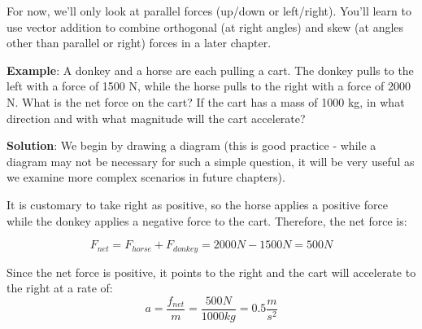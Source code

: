 
For now, we'll only look at parallel forces (up/down or left/right). You'll learn to use vector addition to combine orthogonal (at right angles) and skew (at angles other than parallel or right) forces in a later chapter. 

\textbf{Example}: A donkey and a horse are each pulling a cart. The donkey pulls to the left with a force of 1500 N, while the horse pulls to the right with a force of 2000 N. What is the net force on the cart? If the cart has a mass of 1000 kg, in what direction and with what magnitude will the cart accelerate?

\textbf{Solution}: We begin by drawing a diagram (this is good practice - while a diagram may not be necessary for such a simple question, it will be very useful as we examine more complex scenarios in future chapters). 


It is customary to take right as positive, so the horse applies a positive force while the donkey applies a negative force to the cart. Therefore, the net force is:

$$F_{net} = F_{horse} + F_{donkey} = 2000N - 1500N = 500N$$

Since the net force is positive, it points to the right and the cart will accelerate to the right at a rate of:
$$a = \frac{f_{net}}{m} = \frac{500 N}{1000 kg} = 0.5 \frac{m}{s^2}$$

